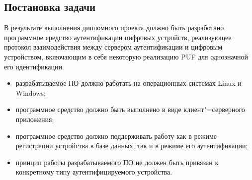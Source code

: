 \subsection{Постановка задачи}
В результате выполнения дипломного проекта должно быть разработано программное средство аутентификации цифровых устройств, реализующее протокол взаимодействия между сервером аутентификации и цифровым устройством, включающим в себя некоторую реализацию PUF для однозначной его идентификации.
\begin{itemize}
\item разрабатываемое ПО должно работать на операционных системах Linux и Windows;
\item программное средство должно быть выполнено в виде клиент"=серверного приложения;
\item программное средство должно поддерживать работу как в режиме регистрации устройства в базе данных, так и в режиме его аутентификации;
\item принцип работы разрабатываемого ПО не должен быть привязан к конкретному типу аутентифицируемого устройства.
\end{itemize}
